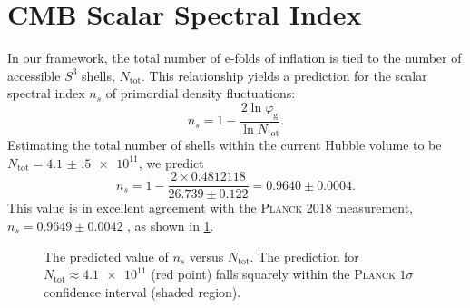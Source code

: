 \documentclass[
  10pt,prd,aps,twocolumn,superscriptaddress,
  nofootinbib,floatfix,tightenlines
]{revtex4-2}
\newcommand{\phig}{\varphi_{\mathrm{g}}} %
\begin{document}
\section{CMB Scalar Spectral Index}
\label{sec:CMB}
In our framework, the total number of e-folds of inflation is tied to the number of accessible \(S^3\) shells, \(N_{\text{tot}}\). This relationship yields a prediction for the scalar spectral index \(n_s\) of primordial density fluctuations:
\begin{equation}
n_s = 1 - \frac{2\ln\phig}{\ln N_{\text{tot}}}.
\label{eq:ns}
\end{equation}
Estimating the total number of shells within the current Hubble volume to be \(N_{\text{tot}}=\num{4.1(5)e11}\), we predict
\begin{equation}
n_s = 1 - \frac{2 \times 0.4812118}{26.739 \pm 0.122} = 0.9640 \pm 0.0004.
\end{equation}
This value is in excellent agreement with the \textsc{Planck} 2018 measurement, \(n_s=0.9649\pm0.0042\) \cite{Planck:2020}, as shown in \cref{fig:cmb_tilt}.

\begin{figure}[t]
\centering
{}
\caption{The predicted value of \(n_s\) versus \(N_{\text{tot}}\). The prediction for \(N_{\text{tot}}\approx\num{4.1e11}\) (red point) falls squarely within the \textsc{Planck} \(1\sigma\) confidence interval (shaded region).}
\label{fig:cmb_tilt}
\end{figure}
\end{document}
